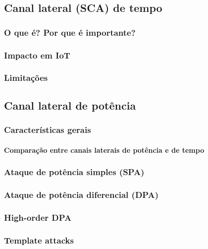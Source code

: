 \subsection{Canal lateral (SCA) de tempo}

\subsubsection{O que é? Por que é importante?}

\subsubsection{Impacto em IoT}

\subsubsection{Limitações}

\subsection{Canal lateral de potência}

\subsubsection{Características gerais}

\paragraph{Comparação entre canais laterais de potência e de tempo}

\subsubsection{Ataque de potência simples (SPA)}

\subsubsection{Ataque de potência diferencial (DPA)}

\subsubsection{High-order DPA}

\subsubsection{Template attacks}